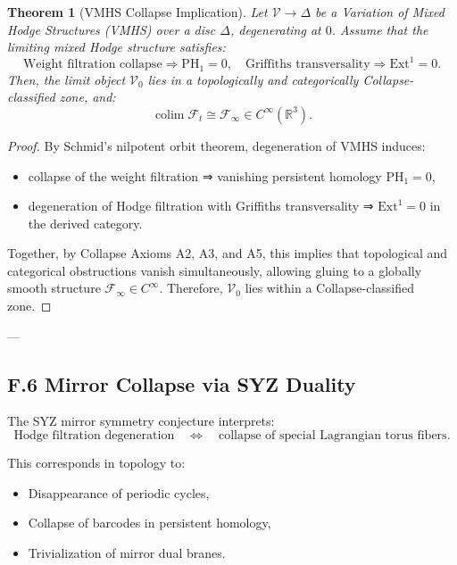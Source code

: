 \documentclass[11pt]{article}
\DeclareMathOperator{\colim}{colim}
\newtheorem{theorem}{Theorem}[section]
\begin{document}
\begin{theorem}[VMHS Collapse Implication]
Let \( \mathcal{V} \to \Delta \) be a Variation of Mixed Hodge Structures (VMHS) over a disc \( \Delta \), degenerating at \( 0 \).  
Assume that the limiting mixed Hodge structure satisfies:
\[
\text{Weight filtration collapse} \Rightarrow \mathrm{PH}_1 = 0,
\quad
\text{Griffiths transversality} \Rightarrow \mathrm{Ext}^1 = 0.
\]
Then, the limit object \( \mathcal{V}_0 \) lies in a topologically and categorically Collapse-classified zone, and:
\[
\colim \mathcal{F}_t \cong \mathcal{F}_\infty \in C^\infty(\mathbb{R}^3).
\]
\end{theorem}

\begin{proof}
By Schmid’s nilpotent orbit theorem, degeneration of VMHS induces:
\begin{itemize}
  \item collapse of the weight filtration ⇒ vanishing persistent homology \( \mathrm{PH}_1 = 0 \),
  \item degeneration of Hodge filtration with Griffiths transversality ⇒ \( \mathrm{Ext}^1 = 0 \) in the derived category.
\end{itemize}
Together, by Collapse Axioms A2, A3, and A5, this implies that topological and categorical obstructions vanish simultaneously,  
allowing gluing to a globally smooth structure \( \mathcal{F}_\infty \in C^\infty \).  
Therefore, \( \mathcal{V}_0 \) lies within a Collapse-classified zone.
\end{proof}

---

\subsection*{F.6 Mirror Collapse via SYZ Duality}

The SYZ mirror symmetry conjecture interprets:
\[
\text{Hodge filtration degeneration}
\quad \Leftrightarrow \quad
\text{collapse of special Lagrangian torus fibers}.
\]

This corresponds in topology to:

\begin{itemize}
  \item Disappearance of periodic cycles,
  \item Collapse of barcodes in persistent homology,
  \item Trivialization of mirror dual branes.
\end{itemize}
\end{document}
